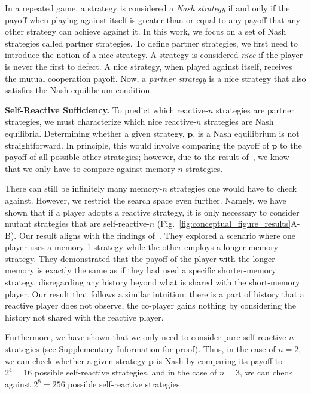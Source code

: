 \documentclass[11pt]{article}
\begin{document}
In a repeated game, a strategy is considered a {\it Nash strategy} if and only if the
payoff when playing against itself is greater than or equal to any payoff that
any other strategy can achieve against it. In this work, we focus on a set of
Nash strategies called partner strategies. To define partner strategies, we
first need to introduce the notion of a nice strategy. A strategy is considered
{\it nice} if the player is never the first to defect. A nice strategy, when played
against itself, receives the mutual cooperation payoff. Now, a {\it partner strategy}
is a nice strategy that also satisfies the Nash equilibrium condition.


\textbf{Self-Reactive Sufficiency.} To predict which reactive-$n$ strategies are
partner strategies, we must characterize which nice reactive-$n$ strategies are
Nash equilibria. Determining whether a given strategy, $\mathbf{p}$, is a Nash
equilibrium is not straightforward. In principle, this would involve comparing
the payoff of $\mathbf{p}$ to the payoff of all possible other strategies;
however, due to the result of~\cite{press:PNAS:2012}, we know that we only have
to compare against memory-$n$ strategies.

There can still be infinitely many memory-$n$ strategies one would have to check
against. However, we restrict the search space even further. Namely, we have
shown that if a player adopts a reactive strategy, it is only necessary to
consider mutant strategies that are self-reactive-$n$
(Fig.~\ref{fig:conceptual_figure_results}A-B). Our result aligns with the findings
of~\cite{press:PNAS:2012}. They explored a scenario where one player uses a
memory-1 strategy while the other employs a longer memory strategy. They
demonstrated that the payoff of the player with the longer memory is exactly the
same as if they had used a specific shorter-memory strategy, disregarding any
history beyond what is shared with the short-memory player. Our result that
follows a similar intuition: there is a part of history that a reactive player
does not observe, the co-player gains nothing by considering the history not
shared with the reactive player.


Furthermore, we have shown that we only need to consider pure self-reactive-$n$
strategies (see Supplementary Information for proof). Thus, in the case of $n =
2$, we can check whether a given strategy $\mathbf{p}$ is Nash by comparing its
payoff to $2^4 = 16$ possible self-reactive strategies, and in the case of $n =
3$, we can check against $2^8 = 256$ possible self-reactive strategies.
\end{document}
